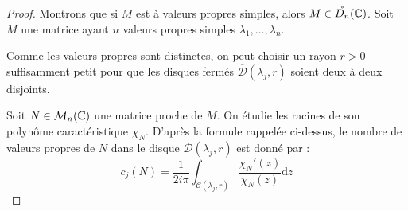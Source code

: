 \begin{proof}
    Montrons que si $M$ est à valeurs propres simples, alors $M \in \mathring{D_n}(\mathbb{C})$. 
    Soit $M$ une matrice ayant $n$ valeurs propres simples $\lambda_1, \dots, \lambda_n$. 
    
    Comme les valeurs propres sont distinctes, on peut choisir un rayon $r > 0$ suffisamment petit pour que les disques fermés $\overline{\mathcal{D}}(\lambda_j, r)$ soient deux à deux disjoints.
    
    \begin{center}
    \end{center}

    Soit $N \in \mathcal{M}_n(\mathbb{C})$ une matrice proche de $M$. On étudie les racines de son polynôme caractéristique $\chi_N$.
    D'après la formule rappelée ci-dessus, le nombre de valeurs propres de $N$ dans le disque $\mathcal{D}(\lambda_j, r)$ est donné par :
    \[ c_j(N) = \frac{1}{2i\pi} \int_{\mathcal{C}(\lambda_j, r)} \frac{\chi_N'(z)}{\chi_N(z)} \mathrm{d}z \]
    

\end{proof}
